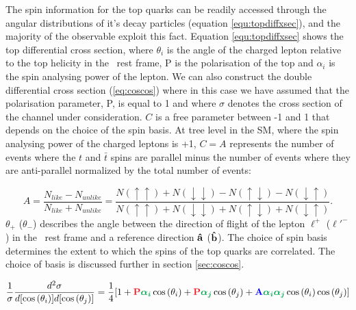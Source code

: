 The spin information for the top quarks can be readily accessed through the angular distributions of it's decay particles (equation \ref{equ:topdiffxsec}), and the majority of the observable exploit this fact. Equation \ref{equ:topdiffxsec} shows the top differential cross section, where $\theta_i$ is the angle of the charged lepton relative to the top helicity in the \ttbar\ rest frame, P is the polarisation of the top and $\alpha_i$ is the spin analysing power of the lepton. We can also construct the double differential cross section (\ref{eq:coscos}) where in this case we have assumed that the polarisation parameter, P, is equal to 1 and where $\sigma$ denotes the cross section of the channel under
consideration. $C$ is a free parameter between -1 and 1 that depends on the choice of the spin basis. At tree level in the SM, where the spin analysing power of the charged leptons is +1, $C=A$ represents the number of events where the $t$ and $\bar{t}$ spins are parallel minus the number of events where they are anti-parallel normalized by the total number of events:

\begin{equation}
    A = \frac{N_{like} - N_{unlike}}{N_{like} + N_{unlike}} =
     \frac{N(\uparrow \uparrow) + N(\downarrow \downarrow) - N(\uparrow \downarrow) - N(\downarrow \uparrow)}
     {N(\uparrow \uparrow) + N(\downarrow \downarrow) + N(\uparrow \downarrow) + N(\downarrow \uparrow)}.
    \label{eqno1}
\end{equation}
$\theta_+$ ($\theta_-$) describes the angle between
the direction of flight of the lepton $\ell^+$ ($\ell'^-$) in the \ttbar\ rest frame and a reference direction $\bf \hat{a}$ ($\bf\hat{b}$). The choice of spin basis determines the extent to which the spins of the top quarks are correlated. The choice of basis is discussed further in section \ref{sec:coscos}.

\begin{equation}
	\frac{1}{\sigma}\frac{d^2\sigma}{d[\cos{(\theta_i)}]d[\cos{(\theta_j)}]}= \frac{1}{4}[ 1 + \textcolor{Red}{\mathbf{P}}\textcolor{Green}{\boldsymbol{\alpha_i}}\cos{(\theta_i)} + \textcolor{Red}{\mathbf{P}}\textcolor{Green}{\boldsymbol{\alpha_j}}\cos{(\theta_j)} + \textcolor{blue}{\mathbf{A}}\textcolor{Green}{\boldsymbol{\alpha_i\alpha_j}}\cos{(\theta_i)}\cos{(\theta_j)}]
\end{equation}

